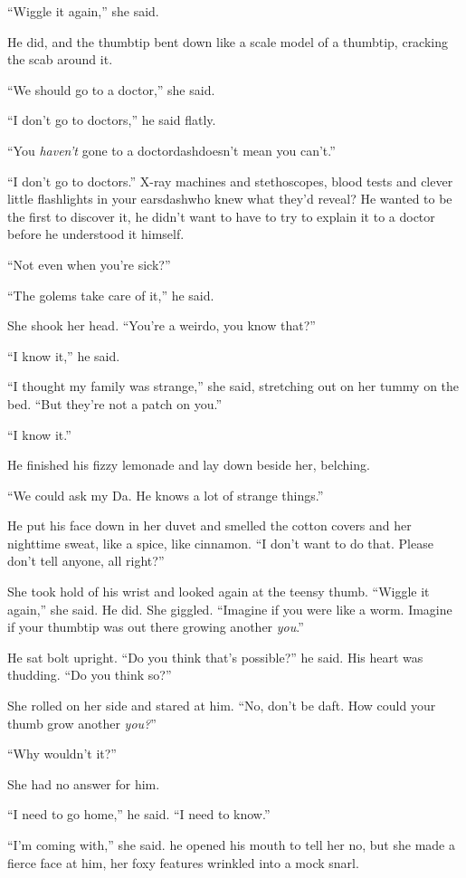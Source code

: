 ``Wiggle it again,'' she said.

He did, and the thumbtip bent down like a scale model of a thumbtip,
cracking the scab around it.

``We should go to a doctor,'' she said.

``I don't go to doctors,'' he said flatly.

``You \textit{haven't} gone to a doctordash{}doesn't mean you can't.''

``I don't go to doctors.'' X-ray machines and stethoscopes, blood
tests and clever little flashlights in your earsdash{}who knew what
they'd reveal?  He wanted to be the first to discover it, he didn't
want to have to try to explain it to a doctor before he understood it
himself.

``Not even when you're sick?''

``The golems take care of it,'' he said.

She shook her head.  ``You're a weirdo, you know that?''

``I know it,'' he said.

``I thought my family was strange,'' she said, stretching out on her
tummy on the bed.  ``But they're not a patch on you.''

``I know it.''

He finished his fizzy lemonade and lay down beside her, belching.

``We could ask my Da.  He knows a lot of strange things.''

He put his face down in her duvet and smelled the cotton covers and
her nighttime sweat, like a spice, like cinnamon.  ``I don't want to
do that.  Please don't tell anyone, all right?''

She took hold of his wrist and looked again at the teensy thumb. 
``Wiggle it again,'' she said.  He did.  She giggled.  ``Imagine if
you were like a worm.  Imagine if your thumbtip was out there growing
another \textit{you}.''

He sat bolt upright.  ``Do you think that's possible?'' he said.  His
heart was thudding.  ``Do you think so?''

She rolled on her side and stared at him.  ``No, don't be daft.  How
could your thumb grow another \textit{you?}''

``Why wouldn't it?''

She had no answer for him.

``I need to go home,'' he said.  ``I need to know.''

``I'm coming with,'' she said.  he opened his mouth to tell her no,
but she made a fierce face at him, her foxy features wrinkled into a
mock snarl.


